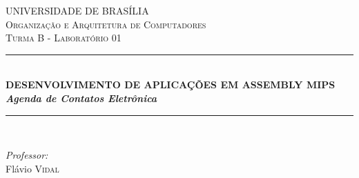 \documentclass[12pt]{article}
\begin{document}
\begin{titlepage}

\newcommand{\HRule}{\rule{\linewidth}{0.5mm}} %

\center %
 

\textsc{\normalsize UNIVERSIDADE DE BRASÍLIA}\\[1.0cm] %
\textsc{\Large Organização e Arquitetura de Computadores}\\[0.2cm] %
\textsc{\large  Turma B - Laboratório 01}\\[0.2cm] %


\HRule \\[0.4cm]
{ \huge \bfseries \LARGE{DESENVOLVIMENTO DE APLICAÇÕES EM ASSEMBLY MIPS} \\ [1.0cm]
\emph{\large{Agenda de Contatos Eletrônica}}
}\\[0.4cm] %
\HRule \\[1.0cm]
 


\begin{minipage}{0.4\textwidth}
\begin{flushright} \large
\emph{Professor:} \\
Flávio \textsc{Vidal} %
\end{flushright}
\end{minipage}\\[2cm]


\end{titlepage}
\end{document}
